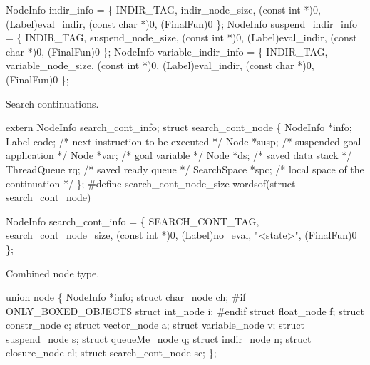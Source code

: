 \nwendcode{}\nwdocspar
\nwenddocs{}\plusendmoddef\nwstartdeflinemarkup{}\nwenddeflinemarkup
NodeInfo indir_info = \{
    INDIR_TAG, indir_node_size, (const int *)0, (Label)eval_indir, (const char *)0,
    (FinalFun)0
\};
NodeInfo suspend_indir_info = \{
    INDIR_TAG, suspend_node_size, (const int *)0, (Label)eval_indir, (const char *)0,
    (FinalFun)0
\};
NodeInfo variable_indir_info = \{
    INDIR_TAG, variable_node_size, (const int *)0, (Label)eval_indir, (const char *)0,
    (FinalFun)0
\};

\nwendcode{}\nwdocspar
Search continuations.

\nwenddocs{}\plusendmoddef\nwstartdeflinemarkup{}\nwenddeflinemarkup
extern NodeInfo search_cont_info;
struct search_cont_node \{
    NodeInfo    *info;
    Label       code;           /* next instruction to be executed */
    Node        *susp;          /* suspended goal application */
    Node        *var;           /* goal variable */
    Node        *ds;            /* saved data stack */
    ThreadQueue rq;             /* saved ready queue */
    SearchSpace *spc;           /* local space of the continuation */
\};
#define search_cont_node_size   wordsof(struct search_cont_node)

\nwendcode{}\nwdocspar
\nwenddocs{}\plusendmoddef\nwstartdeflinemarkup{}\nwenddeflinemarkup
NodeInfo search_cont_info = \{
    SEARCH_CONT_TAG, search_cont_node_size, (const int *)0, (Label)no_eval,
    "<state>", (FinalFun)0
\};

\nwendcode{}\nwdocspar
Combined node type.

\nwenddocs{}\plusendmoddef\nwstartdeflinemarkup{}\nwenddeflinemarkup
union node \{
    NodeInfo *info;
    struct char_node ch;
#if ONLY_BOXED_OBJECTS
    struct int_node i;
#endif
    struct float_node f;
    struct constr_node c;
    struct vector_node a;
    struct variable_node v;
    struct suspend_node s;
    struct queueMe_node q;
    struct indir_node n;
    struct closure_node cl;
    struct search_cont_node sc;
\};

